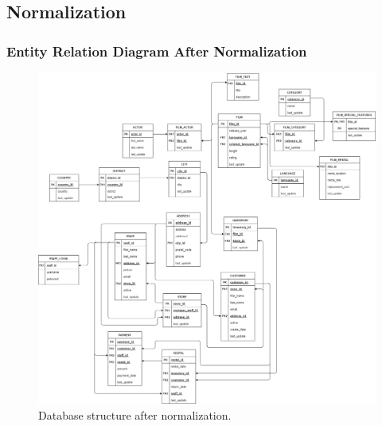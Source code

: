 \documentclass[openany]{article}
\begin{document}
\subsection{Normalization}
	\subsubsection{Entity Relation Diagram After Normalization}
		\begin{figure}[H]
			\includegraphics[width=\textwidth]{er_normalized}
			\caption{Database structure after normalization.}
		\end{figure}
\end{document}
